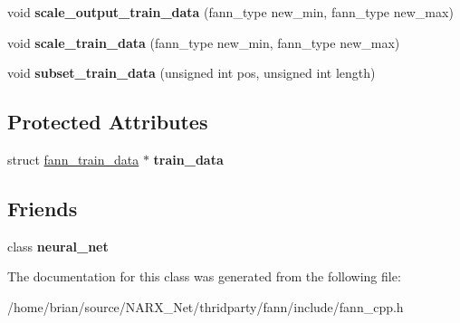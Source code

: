 \begin{DoxyCompactItemize}
\item 
\hypertarget{class_f_a_n_n_1_1training__data_a08ce966422ad8424e658106450bed4b2}{void {\bfseries scale\-\_\-output\-\_\-train\-\_\-data} (fann\-\_\-type new\-\_\-min, fann\-\_\-type new\-\_\-max)}\label{class_f_a_n_n_1_1training__data_a08ce966422ad8424e658106450bed4b2}

\item 
\hypertarget{class_f_a_n_n_1_1training__data_a35431c6becb272a1a55ae03f3c32715e}{void {\bfseries scale\-\_\-train\-\_\-data} (fann\-\_\-type new\-\_\-min, fann\-\_\-type new\-\_\-max)}\label{class_f_a_n_n_1_1training__data_a35431c6becb272a1a55ae03f3c32715e}

\item 
\hypertarget{class_f_a_n_n_1_1training__data_af395d9008eb4448df728d7514d82baf1}{void {\bfseries subset\-\_\-train\-\_\-data} (unsigned int pos, unsigned int length)}\label{class_f_a_n_n_1_1training__data_af395d9008eb4448df728d7514d82baf1}

\end{DoxyCompactItemize}
\subsection*{Protected Attributes}
\begin{DoxyCompactItemize}
\item 
\hypertarget{class_f_a_n_n_1_1training__data_a05af9200c0ad0f6c7901cae2858aeb42}{struct \hyperlink{structfann__train__data}{fann\-\_\-train\-\_\-data} $\ast$ {\bfseries train\-\_\-data}}\label{class_f_a_n_n_1_1training__data_a05af9200c0ad0f6c7901cae2858aeb42}

\end{DoxyCompactItemize}
\subsection*{Friends}
\begin{DoxyCompactItemize}
\item 
\hypertarget{class_f_a_n_n_1_1training__data_ae9a0f1a843c25a56d6fc3c37630413f2}{class {\bfseries neural\-\_\-net}}\label{class_f_a_n_n_1_1training__data_ae9a0f1a843c25a56d6fc3c37630413f2}

\end{DoxyCompactItemize}


The documentation for this class was generated from the following file\-:\begin{DoxyCompactItemize}
\item 
/home/brian/source/\-N\-A\-R\-X\-\_\-\-Net/thridparty/fann/include/fann\-\_\-cpp.\-h\end{DoxyCompactItemize}
